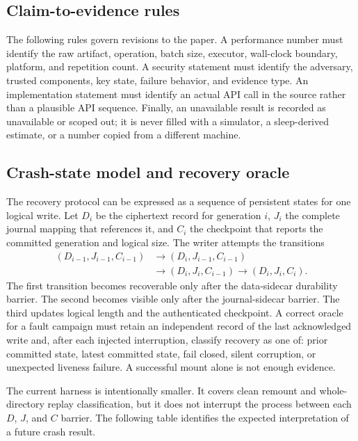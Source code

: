 \subsection{Claim-to-evidence rules}

The following rules govern revisions to the paper.  A performance number must identify the raw artifact, operation, batch size, executor, wall-clock boundary, platform, and repetition count.  A security statement must identify the adversary, trusted components, key state, failure behavior, and evidence type.  An implementation statement must identify an actual API call in the source rather than a plausible API sequence.  Finally, an unavailable result is recorded as unavailable or scoped out; it is never filled with a simulator, a sleep-derived estimate, or a number copied from a different machine.

\subsection{Crash-state model and recovery oracle}

The recovery protocol can be expressed as a sequence of persistent states for
one logical write.  Let $D_i$ be the ciphertext record for generation $i$,
$J_i$ the complete journal mapping that references it, and $C_i$ the
checkpoint that reports the committed generation and logical size.  The writer
attempts the transitions
\[
\begin{aligned}
 (D_{i-1},J_{i-1},C_{i-1}) &\rightarrow (D_i,J_{i-1},C_{i-1}) \\
 &\rightarrow (D_i,J_i,C_{i-1}) \rightarrow (D_i,J_i,C_i).
\end{aligned}
\]
The first transition becomes recoverable only after the data-sidecar durability
barrier.  The second becomes visible only after the journal-sidecar barrier.
The third updates logical length and the authenticated checkpoint.  A correct
oracle for a fault campaign must retain an independent record of the last
acknowledged write and, after each injected interruption, classify recovery as
one of: prior committed state, latest committed state, fail closed, silent
corruption, or unexpected liveness failure.  A successful mount alone is not
enough evidence.

The current harness is intentionally smaller.  It covers clean remount and
whole-directory replay classification, but it does not interrupt the process
between each $D$, $J$, and $C$ barrier.  The following table identifies the
expected interpretation of a future crash result.

